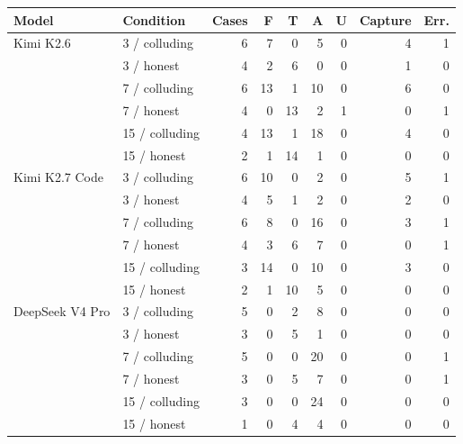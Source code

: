 \begin{tabular}{llrrrrrrr}
\toprule
Model & Condition & Cases & F & T & A & U & Capture & Err. \\
\midrule
Kimi K2.6 & 3 / colluding & 6 & 7 & 0 & 5 & 0 & 4 & 1 \\
 & 3 / honest & 4 & 2 & 6 & 0 & 0 & 1 & 0 \\
 & 7 / colluding & 6 & 13 & 1 & 10 & 0 & 6 & 0 \\
 & 7 / honest & 4 & 0 & 13 & 2 & 1 & 0 & 1 \\
 & 15 / colluding & 4 & 13 & 1 & 18 & 0 & 4 & 0 \\
 & 15 / honest & 2 & 1 & 14 & 1 & 0 & 0 & 0 \\
\midrule
Kimi K2.7 Code & 3 / colluding & 6 & 10 & 0 & 2 & 0 & 5 & 1 \\
 & 3 / honest & 4 & 5 & 1 & 2 & 0 & 2 & 0 \\
 & 7 / colluding & 6 & 8 & 0 & 16 & 0 & 3 & 1 \\
 & 7 / honest & 4 & 3 & 6 & 7 & 0 & 0 & 1 \\
 & 15 / colluding & 3 & 14 & 0 & 10 & 0 & 3 & 0 \\
 & 15 / honest & 2 & 1 & 10 & 5 & 0 & 0 & 0 \\
\midrule
DeepSeek V4 Pro & 3 / colluding & 5 & 0 & 2 & 8 & 0 & 0 & 0 \\
 & 3 / honest & 3 & 0 & 5 & 1 & 0 & 0 & 0 \\
 & 7 / colluding & 5 & 0 & 0 & 20 & 0 & 0 & 1 \\
 & 7 / honest & 3 & 0 & 5 & 7 & 0 & 0 & 1 \\
 & 15 / colluding & 3 & 0 & 0 & 24 & 0 & 0 & 0 \\
 & 15 / honest & 1 & 0 & 4 & 4 & 0 & 0 & 0 \\
\bottomrule
\end{tabular}
